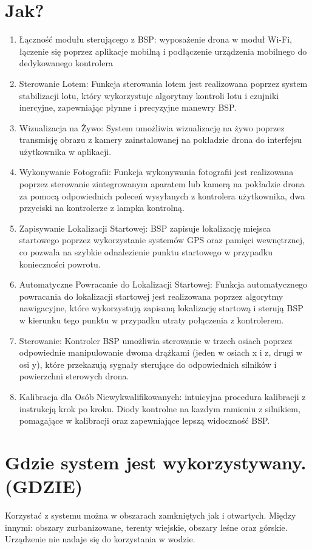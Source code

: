 \documentclass[12pt]{article}
\begin{document}
\section{Jak?}
\begin{enumerate}
    \item Łączność modułu sterującego z BSP: wyposażenie drona w moduł Wi-Fi, łączenie się poprzez aplikacje mobilną i podłączenie urządzenia mobilnego do dedykowanego kontrolera
    \item Sterowanie Lotem: Funkcja sterowania lotem jest realizowana poprzez system stabilizacji lotu, który wykorzystuje algorytmy kontroli lotu i czujniki inercyjne, zapewniając płynne i precyzyjne manewry BSP.
    \item Wizualizacja na Żywo: System umożliwia wizualizację na żywo poprzez transmisję obrazu z kamery zainstalowanej na pokładzie drona do interfejsu użytkownika w aplikacji.
    \item Wykonywanie Fotografii: Funkcja wykonywania fotografii jest realizowana poprzez sterowanie zintegrowanym aparatem lub kamerą na pokładzie drona za pomocą odpowiednich poleceń wysyłanych z kontrolera użytkownika, dwa przyciski na kontrolerze z lampka kontrolną.
    \item Zapisywanie Lokalizacji Startowej: BSP zapisuje lokalizację miejsca startowego poprzez wykorzystanie systemów GPS oraz pamięci wewnętrznej, co pozwala na szybkie odnalezienie punktu startowego w przypadku konieczności powrotu.
    \item Automatyczne Powracanie do Lokalizacji Startowej: Funkcja automatycznego powracania do lokalizacji startowej jest realizowana poprzez algorytmy nawigacyjne, które wykorzystują zapisaną lokalizację startową i sterują BSP w kierunku tego punktu w przypadku utraty połączenia z kontrolerem.
    \item Sterowanie: Kontroler BSP umożliwia sterowanie w trzech osiach poprzez odpowiednie manipulowanie dwoma drążkami (jeden w osiach x i z, drugi w osi y), które przekazują sygnały sterujące do odpowiednich silników i powierzchni sterowych drona.
    \item Kalibracja dla Osób Niewykwalifikowanych: intuicyjna procedura kalibracji z instrukcją krok po kroku. Diody kontrolne na kazdym ramieniu z silnikiem, pomagające w kalibracji oraz zapewniające lepszą widoczność BSP.
\end{enumerate}
\section{Gdzie system jest wykorzystywany. (GDZIE)}
Korzystać z systemu można w obszarach zamkniętych jak i otwartych. Między innymi: obszary zurbanizowane, terenty wiejskie, obszary leśne oraz górskie. Urządzenie nie nadaje się do korzystania w wodzie. 
\end{document}
